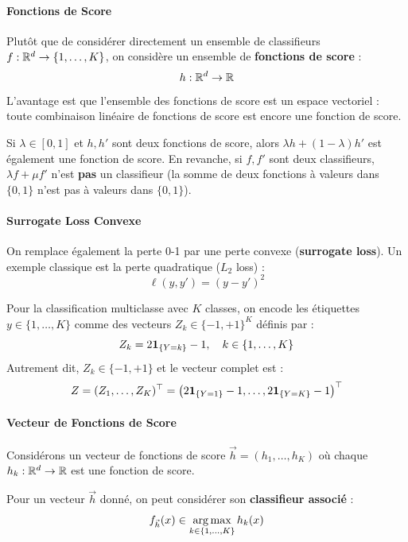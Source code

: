 \paragraph{Fonctions de Score}

Plutôt que de considérer directement un ensemble de classifieurs $f : \mathbb{R}^d \to \{1, \dots, K\}$, on considère un ensemble de \textbf{fonctions de score} :
\[
h : \mathbb{R}^d \to \mathbb{R}
\]
L'avantage est que l'ensemble des fonctions de score est un espace vectoriel : toute combinaison linéaire de fonctions de score est encore une fonction de score.

\begin{remarque}[Convexité]
Si $\lambda \in [0,1]$ et $h, h'$ sont deux fonctions de score, alors $\lambda h + (1-\lambda) h'$ est également une fonction de score. En revanche, si $f, f'$ sont deux classifieurs, $\lambda f + \mu f'$ n'est \textbf{pas} un classifieur (la somme de deux fonctions à valeurs dans $\{0,1\}$ n'est pas à valeurs dans $\{0,1\}$).
\end{remarque}

\paragraph{Surrogate Loss Convexe}

On remplace également la perte 0-1 par une perte convexe (\textbf{surrogate loss}). Un exemple classique est la perte quadratique ($L_2$ loss) :
\[
\ell(y, y') = (y - y')^2
\]

\begin{definition}
Pour la classification multiclasse avec $K$ classes, on encode les étiquettes $y \in \{1, \dots, K\}$ comme des vecteurs $Z_k \in \{-1, +1\}^K$ définis par :
\[
Z_k = 2\mathbf{1}_{\{Y=k\}} - 1, \quad k \in \{1, \dots, K\}
\]
Autrement dit, $Z_k \in \{-1, +1\}$ et le vecteur complet est :
\[
Z = (Z_1, \dots, Z_K)^\top = \big(2\mathbf{1}_{\{Y=1\}} - 1, \dots, 2\mathbf{1}_{\{Y=K\}} - 1\big)^\top
\]
\end{definition}

\paragraph{Vecteur de Fonctions de Score}

Considérons un vecteur de fonctions de score $\vec{h} = (h_1, \dots, h_K)$ où chaque $h_k : \mathbb{R}^d \to \mathbb{R}$ est une fonction de score.

Pour un vecteur $\vec{h}$ donné, on peut considérer son \textbf{classifieur associé} :
\[
f_{\vec{h}}(x) \in \operatorname*{arg\,max}_{k \in \{1, \dots, K\}} h_k(x)
\]

